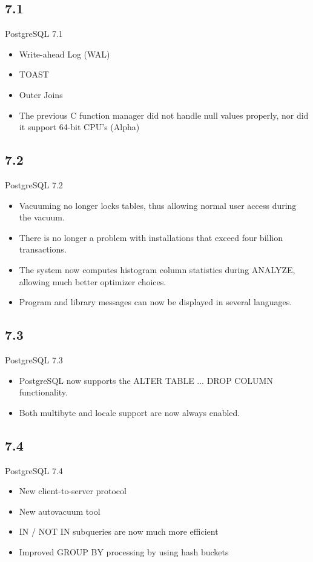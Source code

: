 \documentclass[t,10pt]{beamer}
\begin{document}
\subsection{7.1}
\begin{frame}{PostgreSQL 7.1}
  \begin{itemize}%
  \item Write-ahead Log (WAL)
  \item TOAST
  \item Outer Joins
  \item The previous C function manager did not handle null values properly, nor did it support 64-bit CPU's (Alpha)
  \end{itemize}
\end{frame}
\subsection{7.2}
\begin{frame}{PostgreSQL 7.2}
  \begin{itemize}%
  \item Vacuuming no longer locks tables, thus allowing normal user access during the vacuum.
  \item There is no longer a problem with installations that exceed four billion transactions.
  \item The system now computes histogram column statistics during ANALYZE, allowing much better optimizer choices.
  \item Program and library messages can now be displayed in several languages.
  \end{itemize}
\end{frame}
\subsection{7.3}
\begin{frame}{PostgreSQL 7.3}
  \begin{itemize}%
  \item PostgreSQL now supports the ALTER TABLE ... DROP COLUMN functionality.
  \item Both multibyte and locale support are now always enabled.
  \end{itemize}
\end{frame}
\subsection{7.4}
\begin{frame}{PostgreSQL 7.4}
  \begin{itemize}%
  \item New client-to-server protocol
  \item New autovacuum tool
  \item IN / NOT IN subqueries are now much more efficient
  \item Improved GROUP BY processing by using hash buckets
  \end{itemize}
\end{frame}
\end{document}
